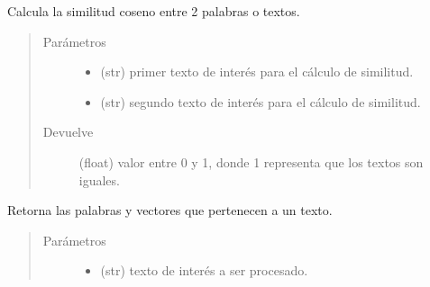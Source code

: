 \documentclass[letterpaper,10pt,openany,spanish]{sphinxmanual}
\begin{document}
\begin{fulllineitems}
\begin{fulllineitems}
\label{\detokenize{funciones/vectorizacion:vectorizacion.VectorizadorWord2Vec.similitud_textos}}
Calcula la similitud coseno entre 2 palabras o textos.
\begin{quote}\begin{description}
\item[{Parámetros}] \leavevmode\begin{itemize}
\item {} 
 \textendash{} (str) primer texto de interés para el cálculo de similitud.

\item {} 
 \textendash{} (str) segundo texto de interés para el cálculo de similitud.

\end{itemize}

\item[{Devuelve}] \leavevmode
(float) valor entre 0 y 1, donde 1 representa que los textos 
son iguales.

\end{description}\end{quote}

\end{fulllineitems}


\begin{fulllineitems}
\label{\detokenize{funciones/vectorizacion:vectorizacion.VectorizadorWord2Vec.vectores_palabras}}
Retorna las palabras y vectores que pertenecen a un texto.
\begin{quote}\begin{description}
\item[{Parámetros}] \leavevmode\begin{itemize}
\item {} 
 \textendash{} (str) texto de interés a ser procesado.


\end{itemize}
\end{description}
\end{quote}
\end{fulllineitems}
\end{fulllineitems}
\end{document}
